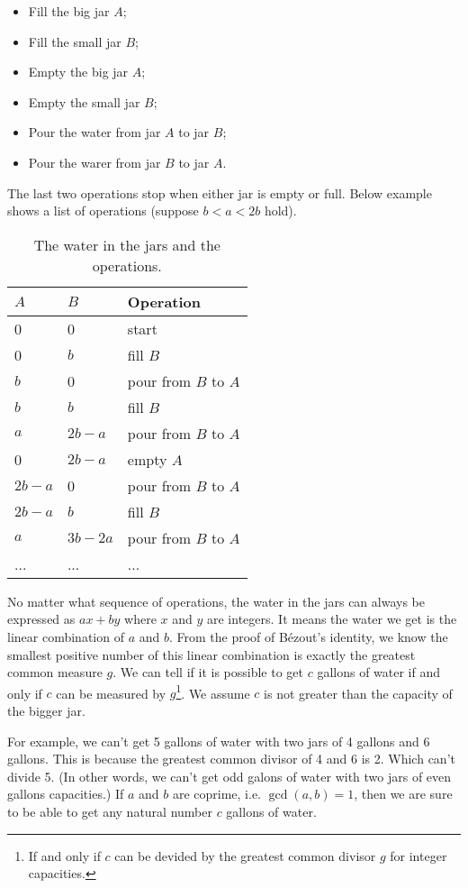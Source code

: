 \documentclass[b5paper]{article}
\begin{document}
\begin{itemize}
\item Fill the big jar $A$;
\item Fill the small jar $B$;
\item Empty the big jar $A$;
\item Empty the small jar $B$;
\item Pour the water from jar $A$ to jar $B$;
\item Pour the warer from jar $B$ to jar $A$.
\end{itemize}

The last two operations stop when either jar is empty or full. Below example shows a list of operations (suppose $b < a < 2b$ hold).

\begin{table}[htbp]
\centering
\begin{tabular}{l|l|l}
$A$ & $B$ & Operation \\
\hline
0 & 0 & start \\
0 & $b$ & fill $B$ \\
$b$ & 0 & pour from $B$ to $A$ \\
$b$ & $b$ & fill $B$ \\
$a$ & $2b - a$ & pour from $B$ to $A$ \\
0 & $2b - a$ & empty $A$ \\
$2b - a$ & 0 & pour from $B$ to $A$ \\
$2b - a$ & $b$ & fill $B$ \\
$a$ & $3b - 2a$ & pour from $B$ to $A$ \\
... & ... & ... \\
\end{tabular}
\caption{The water in the jars and the operations.} \label{tab:jug-ops}
\end{table}

No matter what sequence of operations, the water in the jars can always be expressed as $ax + by$ where $x$ and $y$ are integers. It means the water we get is the linear combination of $a$ and $b$. From the proof of Bézout's identity, we know the smallest positive number of this linear combination is exactly the greatest common measure $g$. We can tell if it is possible to get $c$ gallons of water if and only if $c$ can be measured by $g$\footnote{If and only if $c$ can be devided by the greatest common divisor $g$ for integer capacities.}. We assume $c$ is not greater than the capacity of the bigger jar.

For example, we can't get 5 gallons of water with two jars of 4 gallons and 6 gallons. This is because the greatest common divisor of 4 and 6 is 2. Which can't divide 5. (In other words, we can't get odd galons of water with two jars of even gallons capacities.) If $a$ and $b$ are coprime, i.e. $\gcd(a, b) = 1$, then we are sure to be able to get any natural number $c$ gallons of water.
\end{document}
